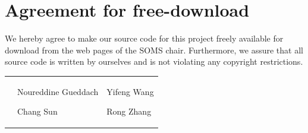 \documentclass[11pt]{article}
\begin{document}

\newpage


\newpage
\section*{Agreement for free-download}
\bigskip


\bigskip


\large We hereby agree to make our source code for this project freely available for download from the web pages of the SOMS chair. Furthermore, we assure that all source code is written by ourselves and is not violating any copyright restrictions.

\begin{center}

    \bigskip


    \bigskip


    \begin{tabular}{@{}p{3.3cm}@{}p{6cm}@{}@{}p{6cm}@{}}
        \begin{minipage}{3cm}

        \end{minipage}
         &
        \begin{minipage}{6cm}
            \vspace{2mm} \large Noureddine Gueddach

            \vspace{\baselineskip}
            \large Chang Sun
        \end{minipage}
         &
        \begin{minipage}{6cm}
            \vspace{2mm} \large Yifeng Wang

            \vspace{\baselineskip}
            \large Rong Zhang
        \end{minipage}
    \end{tabular}


\end{center}
\newpage




\end{document}
